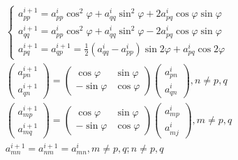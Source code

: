        \begin{equation}
           \label{equ:chap4:jacobian}
            \begin{array}{*{20}{c}}
            {\left\{ {\begin{array}{*{20}{c}}
            {a_{pp}^{i + 1} = a_{pp}^i{{\cos }^2}\varphi  + a_{qq}^i{{\sin }^2}\varphi  + 2a_{pq}^i\cos \varphi \sin \varphi }\\
            {a_{qq}^{i + 1} = a_{pp}^i{{\cos }^2}\varphi  + a_{qq}^i{{\sin }^2}\varphi  - 2a_{pq}^i\cos \varphi \sin \varphi }\\
            {a_{pq}^{i + 1} = a_{qp}^{i + 1} = \frac{1}{2}(a_{qq}^i - a_{pp}^i)\sin 2\varphi  + a_{pq}^i\cos 2\varphi }
            \end{array}} \right.}\\
            {\left( {\begin{array}{*{20}{c}}
            {a_{pn}^{i + 1}}\\
            {a_{qn}^{i + 1}}
            \end{array}} \right) = \left( {\begin{array}{*{20}{c}}
            {\cos \varphi }&{\sin \varphi }\\
            { - \sin \varphi }&{\cos \varphi }
            \end{array}} \right)\left( {\begin{array}{*{20}{c}}
            {a_{pn}^i}\\
            {a_{qn}^i}
            \end{array}} \right),n \ne p,q}\\
            {\left( {\begin{array}{*{20}{c}}
            {a_{mp}^{i + 1}}\\
            {a_{mq}^{i + 1}}
            \end{array}} \right) = \left( {\begin{array}{*{20}{c}}
            {\cos \varphi }&{\sin \varphi }\\
            { - \sin \varphi }&{\cos \varphi }
            \end{array}} \right)\left( {\begin{array}{*{20}{c}}
            {a_{mp}^i}\\
            {a_{mj}^i}
            \end{array}} \right),m \ne p,q}\\
            {a_{mn}^{i + 1} = a_{nm}^{i + 1} = a_{mn}^i,m \ne p,q;n \ne p,q}
            \end{array}
       \end{equation}

